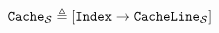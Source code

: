 
\[
  \texttt{Cache}_{\mathcal{S}} \triangleq [ \texttt{Index} \rightarrow
  \texttt{CacheLine}_{\mathcal{S}} ]
\]

